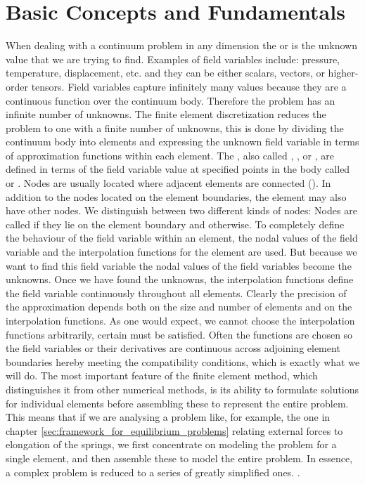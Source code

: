 \section{Basic Concepts and Fundamentals}
When dealing with a continuum problem in any dimension the
 or  is the unknown value
that we are trying to find. Examples of field variables include:
pressure, temperature, displacement, etc. and they can be either
scalars, vectors, or higher-order tensors.
%
Field variables capture infinitely many values because they are a
continuous function over the continuum body.
Therefore the problem has an infinite number of unknowns.
The finite element discretization reduces the
problem to one with a finite number of unknowns, this is done by
dividing the continuum body into elements and expressing the
unknown field variable in terms of approximation functions within each
element.
The , also called ,
, or , are
defined in terms of the field variable value at specified
points in the body called  or .
Nodes are usually located where adjacent elements are connected
(). In addition to the nodes located on the
element boundaries, the element may also have other nodes. 
We distinguish between two different kinds of nodes: Nodes are called
 if they lie on the element boundary and
 otherwise. 
To completely define the behaviour of the field variable within an
element, the nodal values of the field variable and the interpolation
functions for the element are used.
But because we want to find this field variable the nodal values of
the field variables become the unknowns.
Once we have found the unknowns, the interpolation functions define
the field variable continuously throughout all elements.
%
Clearly the precision of the approximation depends both on the size
and number of elements and on the interpolation functions.
As one would expect, we cannot choose the interpolation functions
arbitrarily, certain  must be
satisfied. Often the functions are chosen so the field
variables or their derivatives are continuous across adjoining element
boundaries hereby meeting the compatibility conditions, which is
exactly what we will do.
%
The most important feature of the finite element method, which
distinguishes it from other numerical methods, is its ability to
formulate solutions for individual elements before assembling these to
represent the entire problem.
This means that if we are analysing a problem like, for example, the
one in chapter \vref{sec:framework_for_equilibrium_problems} relating
external forces to elongation of the
springs, we first concentrate on modeling the problem for a single
element, and then assemble these to model the entire problem. In
essence, a complex problem is reduced to a series of greatly
simplified ones. .

